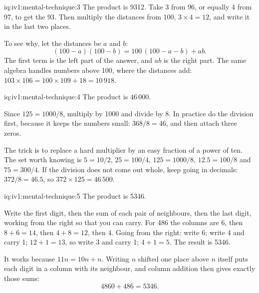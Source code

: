 \begin{solution}{iq:iv1:mental-technique:3}
The product is 9312. Take 3 from 96, or equally 4 from 97, to get the 93. Then multiply the distances from 100, $3 \times 4 = 12$, and write it in the last two places.

To see why, let the distances be $a$ and $b$:
\[
(100 - a)(100 - b) = 100\,(100 - a - b) + ab.
\]
The first term is the left part of the answer, and $ab$ is the right part. The same algebra handles numbers above 100, where the distances add: $103 \times 106 = 100 \times 109 + 18 = 10\,918$.

\end{solution}

\begin{solution}{iq:iv1:mental-technique:4}
The product is $46\,000$.

Since $125 = 1000/8$, multiply by 1000 and divide by 8. In practice do the division first, because it keeps the numbers small: $368 / 8 = 46$, and then attach three zeros.

The trick is to replace a hard multiplier by an easy fraction of a power of ten. The set worth knowing is $5 = 10/2$, $25 = 100/4$, $125 = 1000/8$, $12.5 = 100/8$ and $75 = 300/4$. If the division does not come out whole, keep going in decimals: $372 / 8 = 46.5$, so $372 \times 125 = 46\,500$.

\end{solution}

\begin{solution}{iq:iv1:mental-technique:5}
The product is 5346.

Write the first digit, then the sum of each pair of neighbours, then the last digit, working from the right so that you can carry. For 486 the columns are $6$, then $8 + 6 = 14$, then $4 + 8 = 12$, then $4$. Going from the right: write 6; write 4 and carry 1; $12 + 1 = 13$, so write 3 and carry 1; $4 + 1 = 5$. The result is 5346.

It works because $11n = 10n + n$. Writing $n$ shifted one place above $n$ itself puts each digit in a column with its neighbour, and column addition then gives exactly those sums:
\[
4860 + 486 = 5346.
\]

\end{solution}

